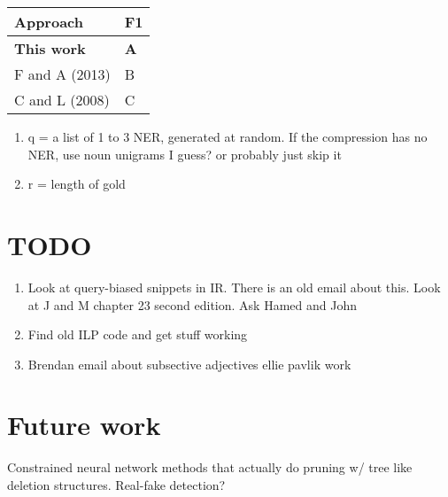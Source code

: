 \documentclass[11pt,a4paper]{article}
\begin{document}
\begin{table}[htb!]
\begin{tabular}{ll}
\centering
Approach & F1 \\ \hline
\textbf{This work}         & \textbf{A}           \\
F and A (2013)    & B           \\
C and L (2008)    & C          
\end{tabular}
\end{table}

\begin{enumerate}
\item{q = a list of 1 to 3 NER, generated at random. If the compression has no NER, use noun unigrams I guess? or probably just skip it}
\item{r = length of gold}
\end{enumerate}



\section{TODO}
\begin{enumerate}
\item{Look at query-biased snippets in IR. There is an old email about this. Look at J and M chapter 23 second edition. Ask Hamed and John}
\item{Find old ILP code and get stuff working}
\item{Brendan email about subsective adjectives ellie pavlik work}
\end{enumerate}

\section{Future work}
Constrained neural network methods that actually do pruning w/ tree like deletion structures. 
Real-fake detection?
\end{document}

